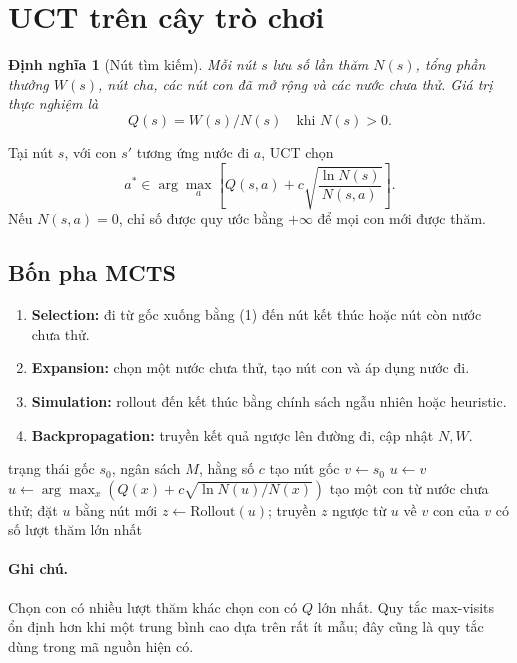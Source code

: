 \documentclass[conference]{IEEEtran}
\newtheorem{definition}{Định nghĩa}[section]
\begin{document}
\section{UCT trên cây trò chơi}
\begin{definition}[Nút tìm kiếm]
Mỗi nút $s$ lưu số lần thăm $N(s)$, tổng phần thưởng $W(s)$, nút cha, các nút
con đã mở rộng và các nước chưa thử. Giá trị thực nghiệm là
\[
Q(s)=W(s)/N(s)\quad\text{khi }N(s)>0.
\]
\end{definition}

Tại nút $s$, với con $s'$ tương ứng nước đi $a$, UCT chọn
\[
a^*\in\arg\max_a\left[Q(s,a)+c\sqrt{\frac{\ln N(s)}{N(s,a)}}\right].
\tag{1}
\]
Nếu $N(s,a)=0$, chỉ số được quy ước bằng $+\infty$ để mọi con mới được thăm.

\subsection{Bốn pha MCTS}
\begin{enumerate}[label=\arabic*.]
\item \textbf{Selection:} đi từ gốc xuống bằng (1) đến nút kết thúc hoặc nút còn
nước chưa thử.
\item \textbf{Expansion:} chọn một nước chưa thử, tạo nút con và áp dụng nước đi.
\item \textbf{Simulation:} rollout đến kết thúc bằng chính sách ngẫu nhiên hoặc
heuristic.
\item \textbf{Backpropagation:} truyền kết quả ngược lên đường đi, cập nhật $N,W$.
\end{enumerate}

\begin{algorithm}[h]
\caption{MCTS--UCT cho trò chơi hai người}
\begin{algorithmic}[1]
\Require trạng thái gốc $s_0$, ngân sách $M$, hằng số $c$
\State tạo nút gốc $v\gets s_0$
  \State $u\gets v$
    \State $u\gets\arg\max_{x}\left(Q(x)+c\sqrt{\ln N(u)/N(x)}\right)$
  \EndWhile
    \State tạo một con từ nước chưa thử; đặt $u$ bằng nút mới
  \EndIf
  \State $z\gets\mathrm{Rollout}(u)$; truyền $z$ ngược từ $u$ về $v$
\EndFor
\State \Return con của $v$ có số lượt thăm lớn nhất
\end{algorithmic}
\end{algorithm}

\paragraph{Ghi chú.} Chọn con có nhiều lượt thăm khác chọn con có $Q$ lớn nhất.
Quy tắc max-visits ổn định hơn khi một trung bình cao dựa trên rất ít mẫu; đây
cũng là quy tắc dùng trong mã nguồn hiện có.
\end{document}

